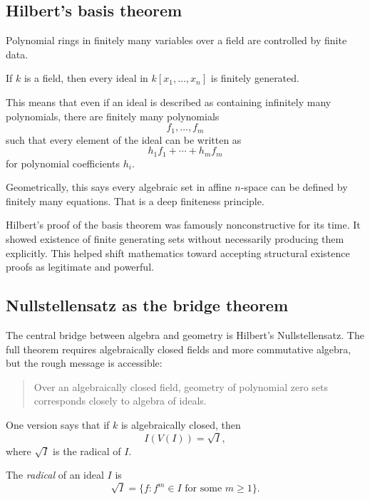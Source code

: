 \subsection{Hilbert's basis theorem}

Polynomial rings in finitely many variables over a field are controlled by
finite data.

\begin{theorem}
If $k$ is a field, then every ideal in $k[x_1,\ldots,x_n]$ is finitely
generated.
\end{theorem}

This means that even if an ideal is described as containing infinitely many
polynomials, there are finitely many polynomials
\[
f_1,\ldots,f_m
\]
such that every element of the ideal can be written as
\[
h_1f_1+\cdots+h_mf_m
\]
for polynomial coefficients $h_i$.

Geometrically, this says every algebraic set in affine $n$-space can be defined
by finitely many equations. That is a deep finiteness principle.

\begin{historybox}
Hilbert's proof of the basis theorem was famously nonconstructive for its time.
It showed existence of finite generating sets without necessarily producing
them explicitly. This helped shift mathematics toward accepting structural
existence proofs as legitimate and powerful.
\end{historybox}

\subsection{Nullstellensatz as the bridge theorem}

The central bridge between algebra and geometry is Hilbert's Nullstellensatz.
The full theorem requires algebraically closed fields and more commutative
algebra, but the rough message is accessible:

\begin{quote}
Over an algebraically closed field, geometry of polynomial zero sets corresponds
closely to algebra of ideals.
\end{quote}

One version says that if $k$ is algebraically closed, then
\[
I(V(I))=\sqrt{I},
\]
where $\sqrt{I}$ is the radical of $I$.

\begin{definition}
The \emph{radical} of an ideal $I$ is
\[
\sqrt{I}=\{f:f^m\in I\text{ for some }m\geq 1\}.
\]
\end{definition}

